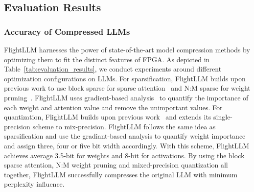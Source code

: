 

\vspace{-5pt}
\subsection{Evaluation Results}
\subsubsection{Accuracy of Compressed LLMs}
FlightLLM harnesses the power of state-of-the-art model compression methods by optimizing them to fit the distinct features of FPGA. 
As depicted in Table~\ref{tab:evaluation_results}, we conduct experiments around different optimization configurations on LLMs.
For sparsification, 
FlightLLM builds upon previous work to use block sparse for sparse attention~\citep{zaheer2020bigbird} and N:M sparse for weight pruning~\cite{nm-sparse-arbitrary}. 
FlightLLM uses gradient-based analysis~\citep{dettmers2022llm_int8} to quantify the importance of each weight and attention value and remove the unimportant values.
For quantization, FlightLLM builds upon previous work~\cite{xiao2023smoothquant} and extends its single-precision scheme to mix-precision. 
FlightLLM follows the same idea as sparsification and use the gradiant-based analysis to quantify weight importance and assign three, four or five bit width accordingly. 
With this scheme, FlightLLM achieves average 3.5-bit for weights and 8-bit for activations.
By using the block sparse attention, N:M weight pruning and mixed-precision quantization all together, FlightLLM successfully compresses the original LLM with minimum perplexity influence.



\vspace{-5pt}

